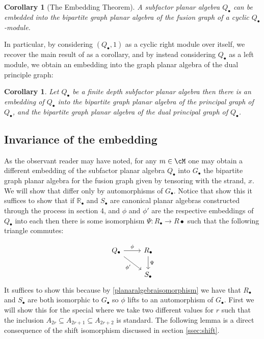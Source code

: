 \documentclass[11pt]{article}
\theoremstyle{plain}
\newtheorem{cor}[thm]{Corollary}
\theoremstyle{definition}
\newcommand{\R}{\mathbb{R}}
\begin{document}
\begin{cor}[The Embedding Theorem]
	A subfactor planar algebra $Q_\bullet$ can be embedded into the bipartite graph planar algebra of the fusion graph of a cyclic $Q_\bullet$-module.
\end{cor}

In particular, by considering $(Q_\bullet,1)$ as a cyclic right module over itself, we recover the main result of \cite{MR2812459} as a corollary, and by instead considering $Q_\bullet$ as a left module, we obtain an embedding into the graph planar algebra of the dual principle graph: 

\begin{cor}
Let $Q_{\bullet}$ be a finite depth subfactor planar algebra then there is an embedding of $Q_{\bullet}$ into the bipartite graph planar algebra of the principal graph of $Q_{\bullet}$, and the bipartite graph planar algebra of the dual principal graph of $Q_{\bullet}$.
\end{cor}

\subsection{Invariance of the embedding}
As the observant reader may have noted, for any $m\in \cM$ one may obtain a different embedding of the subfactor planar algebra $Q_\bullet$ into $G_{\bullet}$ the bipartite graph planar algebra for the fusion graph given by tensoring with the strand, $x$. We will show that differ only by automorphisms of $G_{\bullet}$. Notice that show this it suffices to show that if $\R_{\bullet}$ and $S_{\bullet}$ are canonical planar algebras constructed through the process in section 4, and $\phi$ and $\phi'$ are the respective embeddings of $Q_{\bullet}$ into each then there is some isomorphism $\Psi:R_{\bullet}\rightarrow R{\bullet}$ such that the following triangle commutes:

$$
  \begin{tikzcd}
    Q_{\bullet} \arrow{r}{\phi} \arrow[swap]{dr}{\phi'} & R_{\bullet} \arrow{d}{\Psi} \\
     & S_{\bullet}
  \end{tikzcd}
$$  
It suffices to show this because by \ref{planaralgebraisomorphism} we have that $R_{\bullet}$ and $S_{\bullet}$ are both isomorphic to $G_{\bullet}$ so $\phi$ lifts to an automorphism of $G_{\bullet}$. First we will show this for the special where we take two different values for $r$ such that the inclusion $A_{2r}\subseteq A_{2r+1}\subseteq A_{2r+2}$ is standard. The following lemma is a direct consequence of the shift isomorphism discussed in section \ref{ssec:shift}.
\end{document}
